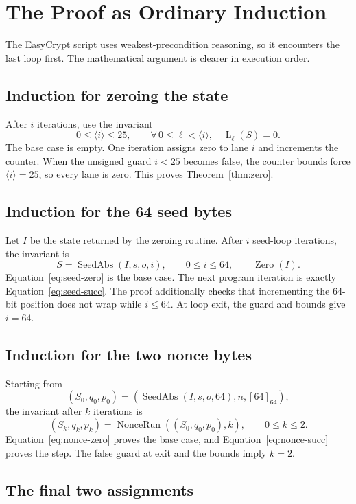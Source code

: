 \documentclass[11pt]{article}
\theoremstyle{definition}
\theoremstyle{plain}
\theoremstyle{remark}
\newcommand{\enc}[1]{\left[#1\right]_{64}}
\newcommand{\uint}[1]{\langle #1\rangle}
\newcommand{\Lane}{\operatorname{L}}
\newcommand{\SeedAbs}{\operatorname{SeedAbs}}
\newcommand{\NonceRun}{\operatorname{NonceRun}}
\begin{document}
\section{The Proof as Ordinary Induction}

The EasyCrypt script uses weakest-precondition reasoning, so it encounters the
last loop first.  The mathematical argument is clearer in execution order.

\subsection{Induction for zeroing the state}

After $i$ iterations, use the invariant
\[
  0\le\uint{i}\le25,
  \qquad
  \forall\,0\le\ell<\uint{i},\quad\Lane_\ell(S)=0.
\]
The base case is empty.  One iteration assigns zero to lane $i$ and increments
the counter.  When the unsigned guard $i<25$ becomes false, the counter bounds
force $\uint{i}=25$, so every lane is zero.  This proves
Theorem~\ref{thm:zero}.

\subsection{Induction for the 64 seed bytes}

Let $I$ be the state returned by the zeroing routine.  After $i$ seed-loop
iterations, the invariant is
\[
  S=\SeedAbs(I,s,o,i),
  \qquad 0\le i\le64,
  \qquad \operatorname{Zero}(I).
\]
Equation~\eqref{eq:seed-zero} is the base case.  The next program iteration is
exactly Equation~\eqref{eq:seed-succ}.  The proof additionally checks that
incrementing the 64-bit position does not wrap while $i\le64$.  At loop exit,
the guard and bounds give $i=64$.

\subsection{Induction for the two nonce bytes}

Starting from
\[
  (S_0,q_0,p_0)
  =(\SeedAbs(I,s,o,64),n,\enc{64}),
\]
the invariant after $k$ iterations is
\[
  (S_k,q_k,p_k)
  =\NonceRun((S_0,q_0,p_0),k),
  \qquad 0\le k\le2.
\]
Equation~\eqref{eq:nonce-zero} proves the base case, and
Equation~\eqref{eq:nonce-succ} proves the step.  The false guard at exit and
the bounds imply $k=2$.

\subsection{The final two assignments}
\end{document}
